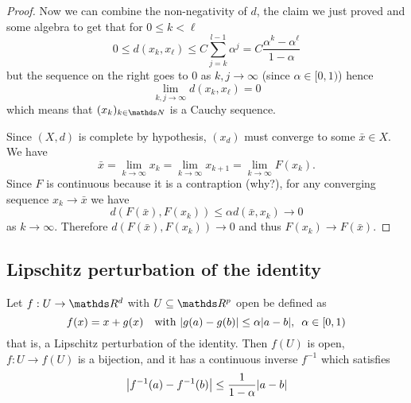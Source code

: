 \documentclass[12pt]{extarticle}
\numberwithin{equation}{section}
\begin{document}
\begin{proof}
    Now we can combine the non-negativity of $d$, the claim we just proved and some algebra to get that for $0 \leq k < \ell$
    \begin{equation}
        0 \leq d(x_k, x_\ell) \leq C \sum_{j = k}^{l-1} \alpha^j = C \frac{\alpha^k - \alpha^\ell}{1-\alpha}
    \end{equation}
    but the sequence on the right goes to $0$ as $k, j \to \infty$ (since $\alpha \in [0, 1)$) hence
    \begin{equation}
        \lim_{k, j \to \infty} d(x_k, x_{\ell}) = 0
    \end{equation}
    which means that $(x_k)_{k \in \N}$ is a Cauchy sequence.

    Since $(X, d)$ is complete by hypothesis, $(x_d)$ must converge to some $\bar x \in X$.
    We have
    \begin{equation}
        \bar x = \lim_{k \to \infty} x_k = \lim_{k \to \infty} x_{k + 1} = \lim_{k \to \infty} F(x_k).
    \end{equation}
    Since $F$ is continuous because it is a contraption (why?), for any converging sequence $x_k \to \bar x$ we have
    \begin{equation}
        d(F(\bar x), F(x_k)) \leq \alpha d(\bar x, x_k) \to 0
    \end{equation}
    as $k \to \infty$.
    Therefore $d(F(\bar x), F(x_k)) \to 0$ and thus $F(x_k) \to F(\bar x)$.
\end{proof}

\subsection{Lipschitz perturbation of the identity}

\begin{theorem}{}{}
    Let $f: U \to \R^d$ with $U \subseteq \R^p$ open be defined as
    \begin{equation}
        f(x) = x + g(x) \quad \text{with } \abs{g(a) - g(b)} \leq \alpha \abs{a - b}, \enspace \alpha \in [0,1)
    \end{equation}
    that is, a Lipschitz perturbation of the identity.
    Then $f(U)$ is open, $f: U \to f(U)$ is a bijection, and it has a continuous inverse $f^{-1}$
    which satisfies
    \begin{equation}
        \abs{f^{-1}(a)- f^{-1}(b)} \leq \frac{1}{1-\alpha} \abs{a-b}
    \end{equation}
\end{theorem}
\end{document}
